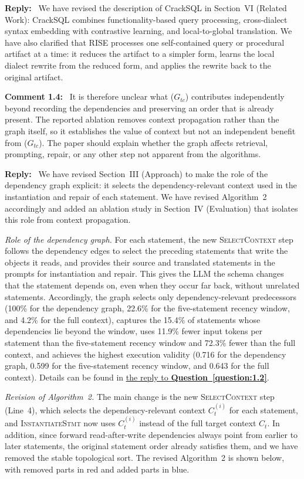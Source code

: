 \documentclass[12pt,letterpaper]{article}
\newcommand{\reviewstart}{\par\addvspace{0.85\baselineskip}\Needspace{4\baselineskip}\noindent}
\newcounter{commentanchor}
\newcommand{\reviewcomment}[1]{\reviewstart\renewcommand{\thecommentanchor}{#1}\refstepcounter{commentanchor}\label{comment:#1}\textbf{Comment #1:}\ }
\newcommand{\questionref}[1]{\hyperref[question:#1]{\uline{the reply to \textbf{Question~\ref*{question:#1}}}}}
\newcommand{\reply}{\par\nobreak\noindent\textbf{Reply:}\ }
\begin{document}
\reply
We have revised the description of CrackSQL in Section~VI (Related Work): CrackSQL combines functionality-based query processing, cross-dialect syntax embedding with contrastive learning, and local-to-global translation. We have also clarified that RISE processes one self-contained query or procedural artifact at a time: it reduces the artifact to a simpler form, learns the local dialect rewrite from the reduced form, and applies the rewrite back to the original artifact.

\reviewcomment{1.4} It is therefore unclear what ($G_{tc}$) contributes independently beyond recording the dependencies and preserving an order that is already present. The reported ablation removes context propagation rather than the graph itself, so it establishes the value of context but not an independent benefit from ($G_{tc}$). The paper should explain whether the graph affects retrieval, prompting, repair, or any other step not apparent from the algorithms.

\reply
We have revised Section~III (Approach) to make the role of the dependency graph explicit: it selects the dependency-relevant context used in the instantiation and repair of each statement. We have revised Algorithm~2 accordingly and added an ablation study in Section~IV (Evaluation) that isolates this role from context propagation.

\textit{Role of the dependency graph.} For each statement, the new \textsc{SelectContext} step follows the dependency edges to select the preceding statements that write the objects it reads, and provides their source and translated statements in the prompts for instantiation and repair. This gives the LLM the schema changes that the statement depends on, even when they occur far back, without unrelated statements. Accordingly, the graph selects only dependency-relevant predecessors (100\% for the dependency graph, 22.6\% for the five-statement recency window, and 4.2\% for the full context), captures the 15.4\% of statements whose dependencies lie beyond the window, uses 11.9\% fewer input tokens per statement than the five-statement recency window and 72.3\% fewer than the full context, and achieves the highest execution validity (0.716 for the dependency graph, 0.599 for the five-statement recency window, and 0.643 for the full context). Details can be found in \questionref{1.2}.

\textit{Revision of Algorithm~2.} The main change is the new \textsc{SelectContext} step (Line~4), which selects the dependency-relevant context $C_t^{(i)}$ for each statement, and \textsc{InstantiateStmt} now uses $C_t^{(i)}$ instead of the full target context $C_t$. In addition, since forward read-after-write dependencies always point from earlier to later statements, the original statement order already satisfies them, and we have removed the stable topological sort. The revised Algorithm~2 is shown below, with removed parts in red and added parts in blue.
\end{document}
